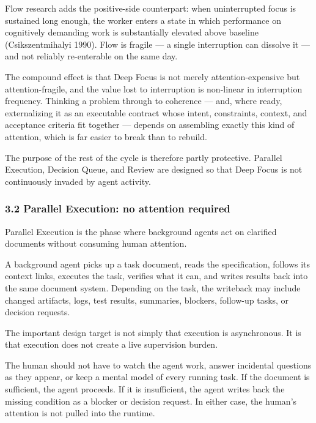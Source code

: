 \documentclass[
  nonatbib,
  preprint]{article}
\begin{document}
Flow research adds the positive-side counterpart: when uninterrupted
focus is sustained long enough, the worker enters a state in which
performance on cognitively demanding work is substantially elevated
above baseline (Csikszentmihalyi 1990). Flow is fragile --- a single
interruption can dissolve it --- and not reliably re-enterable on the
same day.

The compound effect is that Deep Focus is not merely attention-expensive
but attention-fragile, and the value lost to interruption is non-linear
in interruption frequency. Thinking a problem through to coherence ---
and, where ready, externalizing it as an executable contract whose
intent, constraints, context, and acceptance criteria fit together ---
depends on assembling exactly this kind of attention, which is far
easier to break than to rebuild.

The purpose of the rest of the cycle is therefore partly protective.
Parallel Execution, Decision Queue, and Review are designed so that Deep
Focus is not continuously invaded by agent activity.

\subsubsection{\texorpdfstring{\textbf{3.2 Parallel Execution: no
attention
required}}{3.2 Parallel Execution: no attention required}}\label{parallel-execution-no-attention-required}

Parallel Execution is the phase where background agents act on clarified
documents without consuming human attention.

A background agent picks up a task document, reads the specification,
follows its context links, executes the task, verifies what it can, and
writes results back into the same document system. Depending on the
task, the writeback may include changed artifacts, logs, test results,
summaries, blockers, follow-up tasks, or decision requests.

The important design target is not simply that execution is
asynchronous. It is that execution does not create a live supervision
burden.

The human should not have to watch the agent work, answer incidental
questions as they appear, or keep a mental model of every running task.
If the document is sufficient, the agent proceeds. If it is
insufficient, the agent writes back the missing condition as a blocker
or decision request. In either case, the human's attention is not pulled
into the runtime.
\end{document}
